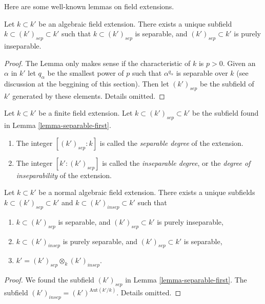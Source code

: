 \noindent
Here are some well-known lemmas on field extensions.

\begin{lemma}
\label{lemma-separable-first}
Let $k \subset k'$ be an algebraic field extension.
There exists a unique subfield $k \subset (k')_{sep} \subset k'$
such that $k \subset (k')_{sep}$ is separable, and
$(k')_{sep} \subset k'$ is purely inseparable.
\end{lemma}

\begin{proof}
The Lemma only makes sense if the characteristic of $k$ is $p > 0$.
Given an $\alpha$ in $k'$ let $q_\alpha$ be the smallest power of $p$
such that $\alpha^{q_\alpha}$ is separable over $k$ (see discussion
at the beggining of this section). Then let $(k')_{sep}$ be the
subfield of $k'$ generated by these elements. Details omitted.
\end{proof}

\begin{definition}
\label{definition-insep-degree}
Let $k \subset k'$ be a finite field extension.
Let $k \subset (k')_{sep} \subset k'$ be the subfield
found in Lemma \ref{lemma-separable-first}.
\begin{enumerate}
\item The integer $[(k')_{sep} : k]$ is called the {\it separable
degree} of the extension.
\item The integer $[k' : (k')_{sep}]$ is called the {\it inseparable
degree}, or the {\it degree of inseparability} of the extension.
\end{enumerate}
\end{definition}

\begin{lemma}
\label{lemma-normal-case}
Let $k \subset k'$ be a normal algebraic field extension.
There exists a unique subfields $k \subset (k')_{sep} \subset k'$
and $k \subset (k')_{insep} \subset k'$ such that
\begin{enumerate}
\item $k \subset (k')_{sep}$ is separable, and
$(k')_{sep} \subset k'$ is purely inseparable,
\item $k \subset (k')_{insep}$ is purely separable, and
$(k')_{sep} \subset k'$ is separable,
\item $k' = (k')_{sep} \otimes_k (k')_{insep}$.
\end{enumerate}
\end{lemma}

\begin{proof}
We found the subfield $(k')_{sep}$ in Lemma \ref{lemma-separable-first}.
The subfield $(k')_{insep} = (k')^{\text{Aut}(k'/k)}$. Details omitted.
\end{proof}

